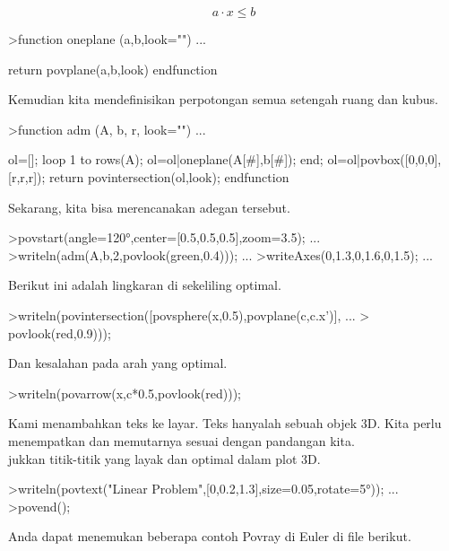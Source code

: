\documentclass{article}
\begin{document}
\begin{eulernotebook}
\begin{eulercomment}
\end{eulercomment}
\begin{eulerformula}
\[
a \cdot x \le b
\]
\end{eulerformula}
\begin{eulerprompt}
>function oneplane (a,b,look="") ...
\end{eulerprompt}
\begin{eulerudf}
    return povplane(a,b,look)
  endfunction
\end{eulerudf}
\begin{eulercomment}
Kemudian kita mendefinisikan perpotongan semua setengah ruang dan
kubus.
\end{eulercomment}
\begin{eulerprompt}
>function adm (A, b, r, look="") ...
\end{eulerprompt}
\begin{eulerudf}
    ol=[];
    loop 1 to rows(A); ol=ol|oneplane(A[#],b[#]); end;
    ol=ol|povbox([0,0,0],[r,r,r]);
    return povintersection(ol,look);
  endfunction
\end{eulerudf}
\begin{eulercomment}
Sekarang, kita bisa merencanakan adegan tersebut.
\end{eulercomment}
\begin{eulerprompt}
>povstart(angle=120°,center=[0.5,0.5,0.5],zoom=3.5); ...
>writeln(adm(A,b,2,povlook(green,0.4))); ...
>writeAxes(0,1.3,0,1.6,0,1.5); ...
\end{eulerprompt}
\begin{eulercomment}
Berikut ini adalah lingkaran di sekeliling optimal.
\end{eulercomment}
\begin{eulerprompt}
>writeln(povintersection([povsphere(x,0.5),povplane(c,c.x')], ...
>  povlook(red,0.9)));
\end{eulerprompt}
\begin{eulercomment}
Dan kesalahan pada arah yang optimal.
\end{eulercomment}
\begin{eulerprompt}
>writeln(povarrow(x,c*0.5,povlook(red)));
\end{eulerprompt}
\begin{eulercomment}
Kami menambahkan teks ke layar. Teks hanyalah sebuah objek 3D. Kita
perlu menempatkan dan memutarnya sesuai dengan pandangan kita.\\
jukkan titik-titik yang layak dan optimal dalam plot 3D.
\end{eulercomment}
\begin{eulerprompt}
>writeln(povtext("Linear Problem",[0,0.2,1.3],size=0.05,rotate=5°)); ...
>povend();
\end{eulerprompt}
\begin{eulercomment}
Anda dapat menemukan beberapa contoh Povray di Euler di file berikut.



\end{eulercomment}
\end{eulernotebook}
\end{document}
